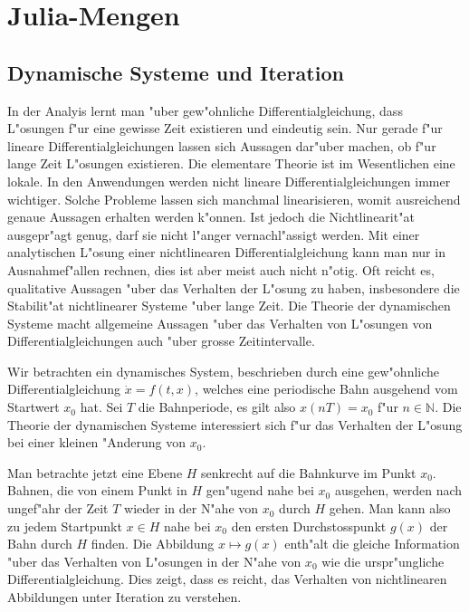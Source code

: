 \chapter{Julia-Mengen\label{chapter:julia}}
\begin{refsection}

\section{Dynamische Systeme und Iteration}
In der Analyis lernt man "uber 
gew"ohnliche Differentialgleichung, dass L"osungen f"ur eine gewisse
Zeit existieren und eindeutig sein.
Nur gerade f"ur lineare Differentialgleichungen lassen sich Aussagen 
dar"uber machen, ob f"ur lange Zeit L"osungen existieren.
Die elementare Theorie ist im Wesentlichen eine lokale.
In den Anwendungen werden nicht lineare Differentialgleichungen immer
wichtiger.
Solche Probleme lassen sich manchmal linearisieren, womit ausreichend
genaue Aussagen erhalten werden k"onnen.
Ist jedoch die Nichtlinearit"at ausgepr"agt genug, darf sie nicht l"anger
vernachl"assigt werden.
Mit einer analytischen L"osung einer nichtlinearen Differentialgleichung
kann man nur in Ausnahmef"allen rechnen, dies ist aber meist auch nicht
n"otig. Oft reicht es, qualitative Aussagen "uber das Verhalten der
L"osung zu haben,
insbesondere die Stabilit"at nichtlinearer Systeme "uber lange Zeit.
Die Theorie der dynamischen Systeme macht allgemeine Aussagen "uber das
Verhalten von L"osungen von Differentialgleichungen auch "uber grosse
Zeitintervalle.

Wir betrachten ein dynamisches System, beschrieben durch eine
gew"ohnliche Differentialgleichung $\dot x= f(t,x)$, welches eine
periodische Bahn ausgehend vom Startwert $x_0$ hat.
Sei $T$ die Bahnperiode, es gilt also
$x(nT)=x_0$ f"ur $n\in\mathbb N$.
Die Theorie der dynamischen Systeme interessiert sich f"ur das Verhalten
der L"osung bei einer kleinen "Anderung von $x_0$.

Man betrachte jetzt eine Ebene $H$ senkrecht auf die Bahnkurve im Punkt $x_0$.
Bahnen, die von einem Punkt in $H$ gen"ugend nahe bei $x_0$ ausgehen, werden
nach ungef"ahr der Zeit $T$ wieder in der N"ahe von $x_0$ durch $H$ gehen.
Man kann also zu jedem Startpunkt $x\in H$ nahe bei $x_0$ den ersten
Durchstosspunkt $g(x)$ der Bahn durch $H$ finden.
Die Abbildung $x\mapsto g(x)$ enth"alt die gleiche Information "uber das
Verhalten von L"osungen in der N"ahe von $x_0$ wie die urspr"ungliche
Differentialgleichung.
Dies zeigt, dass es reicht, das Verhalten von nichtlinearen Abbildungen
unter Iteration zu verstehen.


\end{refsection}
